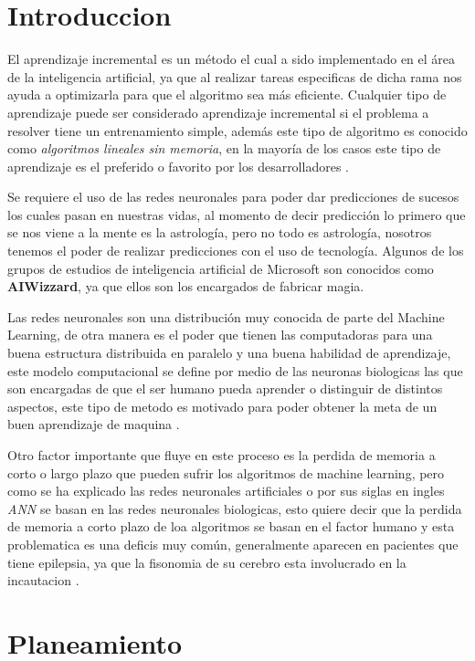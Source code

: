 \section{Introduccion}

El aprendizaje incremental es un método el cual a sido implementado en el área de la inteligencia artificial, ya que al realizar tareas especificas de dicha rama nos 
ayuda a optimizarla para que el algoritmo sea más eficiente.
Cualquier tipo de aprendizaje puede ser considerado aprendizaje incremental si el problema a resolver tiene un entrenamiento simple, adem\'as este tipo de algoritmo es conocido como \textit{algoritmos lineales sin memoria},
en la mayor\'ia de los casos este tipo de aprendizaje es el preferido o favorito por los desarrolladores \cite{GiraudCarrier2000}.

Se requiere el uso de las redes neuronales para poder dar predicciones de sucesos los cuales pasan en nuestras vidas, al momento de decir predicción lo primero que se 
nos viene a la mente es la astrología, pero no todo es astrología, nosotros tenemos el poder de realizar predicciones con el uso de tecnología. Algunos de los grupos de estudios de inteligencia artificial de Microsoft
son conocidos como \textbf{AIWizzard}, ya que ellos son los encargados de fabricar magia.

Las redes neuronales son una distribuci\'on muy conocida de parte del Machine Learning, de otra manera es el poder que tienen las computadoras para una buena estructura distribuida en paralelo y una buena habilidad de aprendizaje, 
este modelo computacional se define por medio de las neuronas biologicas las que son encargadas de que el ser humano pueda aprender o distinguir de distintos aspectos, este tipo de 
metodo es motivado para poder obtener la meta de un buen aprendizaje de maquina \cite{liu2015}.

Otro factor importante que fluye en este proceso es la perdida de memoria a corto o largo plazo que pueden sufrir los algoritmos de machine learning, pero como se ha explicado las redes neuronales artificiales o por sus siglas en ingles 
\textit{ANN} se basan en las redes neuronales biologicas, esto quiere decir que la perdida de memoria a corto plazo de loa algoritmos se basan en el factor humano y esta problematica es una deficis muy com\'un, generalmente aparecen en pacientes
que tiene epilepsia, ya que la fisonomia de su cerebro esta involucrado en la incautacion \cite{TRAMONINEGRE2017}.

\section{Planeamiento}

